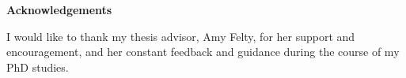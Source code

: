 
\begin{center}\textbf{Acknowledgements}\end{center}

I would like to thank my thesis advisor, Amy Felty, for her support and encouragement, and her constant feedback and guidance during the course of my PhD studies.


\cleardoublepage
